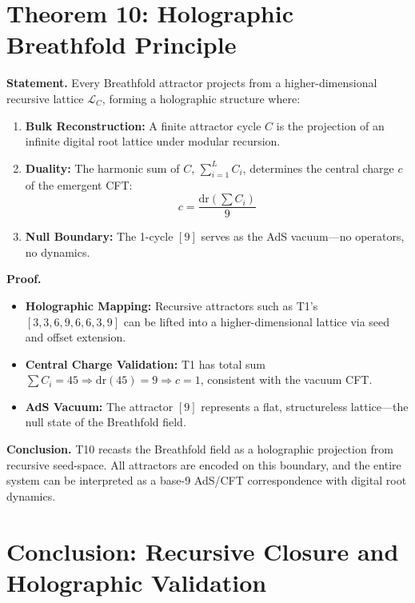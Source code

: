 \documentclass[12pt]{article}
\begin{document}
\section*{Theorem 10: Holographic Breathfold Principle}
\textbf{Statement.} Every Breathfold attractor projects from a higher-dimensional recursive lattice \( \mathcal{L}_C \), forming a holographic structure where:
\begin{enumerate}
  \item \textbf{Bulk Reconstruction:} A finite attractor cycle \( C \) is the projection of an infinite digital root lattice under modular recursion.
  \item \textbf{Duality:} The harmonic sum of \( C \), \( \sum_{i=1}^{L} C_i \), determines the central charge \( c \) of the emergent CFT:
    \[
    c = \frac{\mathrm{dr}\left(\sum C_i\right)}{9}
    \]
  \item \textbf{Null Boundary:} The 1-cycle \([9]\) serves as the AdS vacuum—no operators, no dynamics.
\end{enumerate}

\textbf{Proof.}
\begin{itemize}
  \item \textbf{Holographic Mapping:} Recursive attractors such as T1's \([3,3,6,9,6,6,3,9]\) can be lifted into a higher-dimensional lattice via seed and offset extension.
  \item \textbf{Central Charge Validation:} T1 has total sum \( \sum C_i = 45 \Rightarrow \mathrm{dr}(45) = 9 \Rightarrow c = 1 \), consistent with the vacuum CFT.
  \item \textbf{AdS Vacuum:} The attractor \([9]\) represents a flat, structureless lattice—the null state of the Breathfold field.
\end{itemize}

\textbf{Conclusion.} T10 recasts the Breathfold field as a holographic projection from recursive seed-space. All attractors are encoded on this boundary, and the entire system can be interpreted as a base-9 AdS/CFT correspondence with digital root dynamics.

\section*{Conclusion: Recursive Closure and Holographic Validation}
\end{document}
